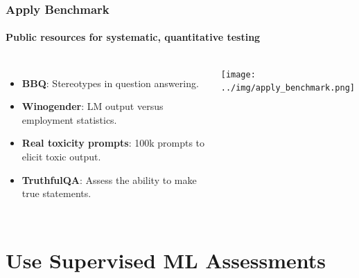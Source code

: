 \documentclass[11pt,
               aspectratio=169,
               hyperref={colorlinks}
               ]{beamer}
\begin{document}
		\begin{frame}
			
			\frametitle{Apply Benchmark}
			\framesubtitle{Public resources for systematic, quantitative testing}
			
			\begin{columns}
				\vspace{-5pt}
				\begin{itemize}
					\item \textbf{BBQ}: Stereotypes in question answering.
					\item \textbf{Winogender}: LM output versus employment statistics.
					\item \textbf{Real toxicity prompts}: 100k prompts to elicit toxic output.
					\item \textbf{TruthfulQA}: Assess the ability to make true statements.
				\end{itemize}
				\centering
				\newline  \newline  \newline
				\texttt{[image: ../img/apply\_benchmark.png]} 
				\newline
			\end{columns}
					
		\end{frame}


	\section{Use Supervised ML Assessments}
\end{document}
